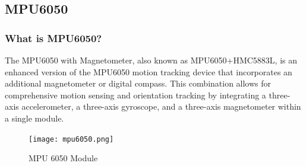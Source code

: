 \documentclass[
12pt,
oneside, 
onehalfspacing, 
nolistspacing, 
parskip, 
chapterinoneline, 
]{AASTCOMPUTER}
\begin{document}
\subsection{MPU6050}

\subsubsection{What is MPU6050?}

The MPU6050 with Magnetometer, also known as MPU6050+HMC5883L, is an enhanced version of the MPU6050 motion tracking device that incorporates an additional magnetometer or digital compass. This combination allows for comprehensive motion sensing and orientation tracking by integrating a three-axis accelerometer, a three-axis gyroscope, and a three-axis magnetometer within a single module.

\begin{figure}[!ht]
\centering
\texttt{[image: mpu6050.png]}
\caption[mpu6050]{MPU 6050 Module}
\label{fig:MPU6050}
\end{figure}
\end{document}
